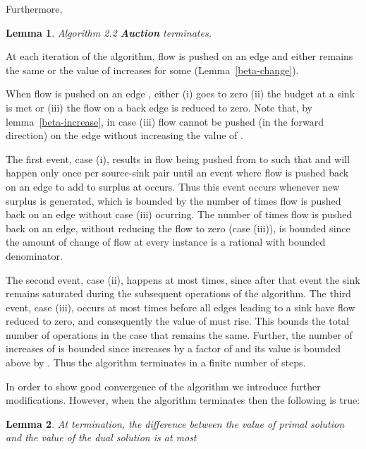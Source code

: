 \documentclass[11pt]{article}
\newenvironment{proof}{\par\noindent{\bf Proof:}}{\mbox{}\hfill\\}
\newtheorem{lemma}{Lemma}[section]
\newcounter{rem}
\begin{document}
Furthermore,
\begin{lemma}
Algorithm 2.2 {\bf Auction}  terminates.
\end{lemma}
\begin{proof}
At each iteration of the algorithm, flow is pushed on an edge and 
 either remains the same or
the value of  increases for some  (Lemma~\ref{beta-change}). 

When flow is pushed on an edge , either (i)  goes to zero  (ii) the budget at a
sink  is met or  (iii) the flow on a back edge  is reduced to zero.
Note that, by lemma~\ref{beta-increase}, in case (iii) flow cannot be pushed (in the forward direction)
on the edge  without
increasing the value of . 

The first event, case (i), results in flow being pushed from  to 
such that  and will happen only once per source-sink pair
until an event where flow is pushed back on an edge  to add to  surplus at 
occurs. Thus this event occurs whenever new surplus is generated, which
is bounded by the number of times  flow is pushed back on an edge without
case (iii) ocurring.
The number of times flow is pushed back on an edge, without reducing the
flow to zero (case (iii)), is bounded since 
the amount of change of flow at every instance is a rational with
bounded denominator.

The second event, case (ii),
happens  at most  times, since after that event
the sink remains saturated during the subsequent operations of the algorithm. 
The third event, case (iii), occurs at most  times before all edges 
leading to a sink have flow reduced to zero, and consequently the value of
 must rise.
This bounds the total number of operations
in the case that  remains the same.
Further, the number of increases of  is bounded since  
increases by a factor of  and its value is bounded above
by . Thus the algorithm terminates in a finite number of steps.
\end{proof}

In order to show good convergence of the algorithm we 
introduce further modifications. However, when the algorithm terminates
then the following is true:
\vspace*{12pt}
\begin{lemma}
At termination, the difference between the value of 
primal solution  and the value of the 
dual solution is at most 
\label{lemma_approx}
\end{lemma}
\end{document}
